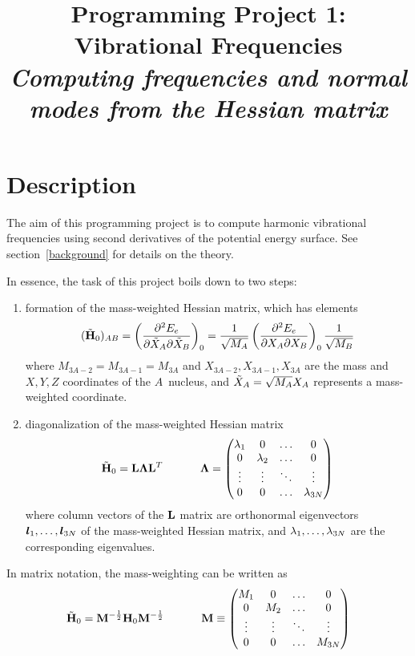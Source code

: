 \documentclass[11pt]{article}
\title{Programming Project 1: Vibrational Frequencies\\
\textit{Computing frequencies and normal modes from the Hessian matrix}}
\date{}
\begin{document}
\maketitle

\section*{Description}
The aim of this programming project is to compute harmonic vibrational frequencies
using second derivatives of the potential energy surface. See
section~\ref{background} for details on the theory.

In essence, the task of this project boils down to two steps:
\begin{enumerate}
    \item formation of the mass-weighted Hessian matrix, which has elements
\begin{align}
(\tilde{\mathbf{H}}_0)_{AB}
    = \left(\dfrac{\partial^2E_e}{\partial\tilde{X}_A \partial\tilde{X}_B}\right)_0
    = \dfrac{1}{\sqrt{M_A}} \left(\dfrac{\partial^2E_e}{\partial X_A\partial X_B}\right)_0 \dfrac{1}{\sqrt{M_B}}
\end{align}
where $M_{3A-2} = M_{3A-1} = M_{3A}$ and $X_{3A-2}, X_{3A-1}, X_{3A}$ are the
mass and $X,Y,Z$ coordinates of the $A$\eth\ nucleus, and
$\tilde{X}_A = \sqrt{M_A} X_A$ represents a mass-weighted coordinate.
    \item diagonalization of the mass-weighted Hessian matrix
\begin{align}
\tilde{\mathbf{H}}_0
    = \mathbf{L} \bm{\Lambda} \mathbf{L}^T \ \ \ \ \ \ \ \ \ \  \bm{\Lambda}
    = \left(\begin{matrix}\lambda_1&   0   &  \ldots  &    0     \\
            0  & \lambda_2 &  \ldots  &    0     \\
           \vdots &  \vdots  &  \ddots  &   \vdots    \\
            0  &   0   &  \ldots  & \lambda_{3N} \end{matrix}\right)
\end{align}
where column vectors of the $\mathbf{L}$ matrix are orthonormal eigenvectors
$\bm{l}_1, \ldots, \bm{l}_{3N}$ of the mass-weighted Hessian matrix, and
$\lambda_1, \ldots, \lambda_{3N}$ are the corresponding eigenvalues.
\end{enumerate}
In matrix notation, the mass-weighting can be written as
\begin{align}
    \tilde{\mathbf{H}}_0
=   \mathbf{M}^{-\frac{1}{2}} \mathbf{H}_0 \mathbf{M}^{-\frac{1}{2}}
\ \ \ \ \ \ \ \ \ \  \mathbf{M}
\equiv
    \left(\begin{matrix} M_1 &  0  & \ldots &   0    \\
          0  & M_2 & \ldots &   0    \\
         \vdots & \vdots & \ddots &  \vdots   \\
          0  & 0   & \ldots & M_{3N} \end{matrix}\right)
\end{align}
\end{document}
